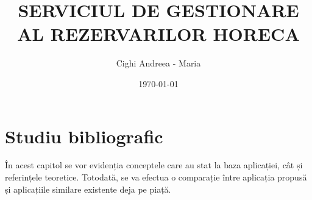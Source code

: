\documentclass[a4paper,12pt]{book}
\begin{document}
\frontmatter  %

\title{SERVICIUL DE GESTIONARE AL REZERVARILOR HORECA}
\author{Cighi Andreea - Maria}
\date{\today}
\maketitle
\tableofcontents  %
\listoffigures
\listoftables

\mainmatter  %

\chapter{Studiu bibliografic}

\indent În acest capitol se vor evidenția conceptele care au stat la baza aplicației, 
cât și referințele teoretice. Totodată, se va efectua o comparație între aplicația propusă și aplicațiile similare existente deja pe piață.
\end{document}
